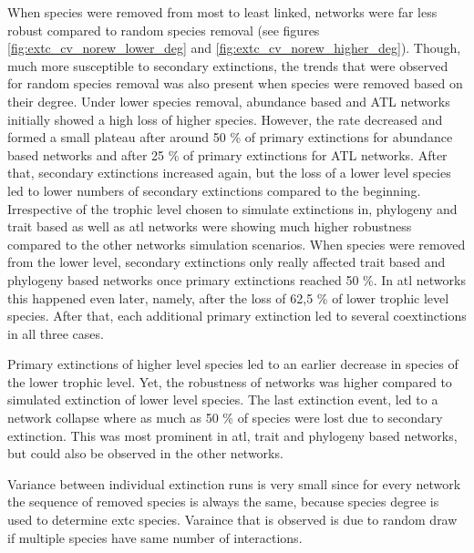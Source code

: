 \documentclass[12pt,a4paper]{article}
\begin{document}
When species were removed from most to least linked, networks were far less robust compared to random species removal (see figures \ref{fig:extc_cv_norew_lower_deg} and \ref{fig:extc_cv_norew_higher_deg}). Though, much more susceptible to secondary extinctions, the trends that were observed for random species removal was also present when species were removed based on their degree. Under lower species removal, abundance based and ATL networks initially showed a high loss of higher species. However, the rate decreased and formed a small plateau after around 50 \% of primary extinctions for abundance based networks and after 25 \% of primary extinctions for ATL networks. After that, secondary extinctions increased again, but the loss of a lower level species led to lower numbers of secondary extinctions compared to the beginning.\\ Irrespective of the trophic level chosen to simulate extinctions in, phylogeny and trait based as well as atl networks were showing much higher robustness compared to the other networks simulation scenarios. When species were removed from the lower level, secondary extinctions only really affected trait based and phylogeny based networks once primary extinctions reached 50 \%. In atl networks this happened even later, namely, after the loss of 62,5 \% of lower trophic level species. After that, each additional primary extinction led to several coextinctions in all three cases. \par 
Primary extinctions of higher level species led to an earlier decrease in species of the lower trophic level. Yet, the robustness of networks was higher compared to simulated extinction of lower level species. The last extinction event, led to a network collapse where as much as 50 \% of species were lost due to secondary extinction. This was most prominent in atl, trait and phylogeny based networks, but could also be observed in the other networks. 



Variance between individual extinction runs is very small since for every network the sequence of removed species is always the same, because species degree is used to determine extc species. Varaince that is observed is due to random draw if multiple species have same number of interactions.
\end{document}
